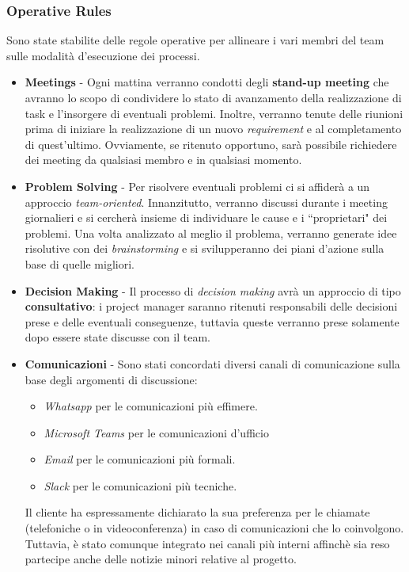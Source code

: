 \subsubsection{Operative Rules}
\label{sec:planning-operative-rules}
Sono state stabilite delle regole operative per allineare i vari membri del team sulle modalità d'esecuzione dei processi.
\begin{itemize}
    \item \textbf{Meetings} - Ogni mattina verranno condotti degli \textbf{stand-up meeting} che avranno lo scopo di condividere lo stato di avanzamento della realizzazione di task e l'insorgere di eventuali problemi. Inoltre, verranno tenute delle riunioni prima di iniziare la realizzazione di un nuovo \textit{requirement} e al completamento di quest'ultimo. Ovviamente, se ritenuto opportuno, sarà possibile richiedere dei meeting da qualsiasi membro e in qualsiasi momento.
    \item \textbf{Problem Solving} - Per risolvere eventuali problemi ci si affiderà a un approccio \textit{team-oriented}. Innanzitutto, verranno discussi durante i meeting giornalieri e si cercherà insieme di individuare le cause e i ``proprietari" dei problemi. Una volta analizzato al meglio il problema, verranno generate idee risolutive con dei \textit{brainstorming} e si svilupperanno dei piani d'azione sulla base di quelle migliori.
    \item \textbf{Decision Making} - Il processo di \textit{decision making} avrà un approccio di tipo \textbf{consultativo}: i project manager saranno ritenuti responsabili delle decisioni prese e delle eventuali conseguenze, tuttavia queste verranno prese solamente dopo essere state discusse con il team.
    \item \textbf{Comunicazioni} - Sono stati concordati diversi canali di comunicazione sulla base degli argomenti di discussione:
    \begin{itemize}
        \item \textit{Whatsapp} per le comunicazioni più effimere.
        \item \textit{Microsoft Teams} per le comunicazioni d'ufficio
        \item \textit{Email} per le comunicazioni più formali.
        \item \textit{Slack} per le comunicazioni più tecniche.
    \end{itemize}
    Il cliente ha espressamente dichiarato la sua preferenza per le chiamate (telefoniche o in videoconferenza) in caso di comunicazioni che lo coinvolgono. Tuttavia, è stato comunque integrato nei canali più interni affinchè sia reso partecipe anche delle notizie minori relative al progetto.
\end{itemize}

